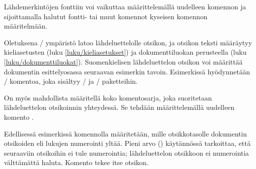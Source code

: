 \begin{koodilohkosis}
\setlength{\parindent}{1.1em} %
\setlength{\bibhang}{\parindent}
\setlength{\bibsep}{.5ex plus .1ex minus .1ex}
\end{koodilohkosis}

Lähdemerkintöjen fonttiin voi vaikuttaa määrittelemällä uudelleen
komennon  ja sijoittamalla halutut fontti- tai muut
komennot kyseisen komennon määritelmään.

\begin{koodilohkosis}
\renewcommand{\bibfont}{\sffamily\small}
\end{koodilohkosis}

Oletuksena \-/ ympäristö latoo
lähdeluettelolle otsikon, ja otsikon teksti määräytyy kieliasetusten
(luku \ref{luku/kieliasetukset}) ja dokumenttiluokan perusteella (luku
\ref{luku/dokumenttiluokat}). Suomenkielisen lähdeluettelon otsikon voi
määrittää dokumentin esittelyosassa seuraavan esimerkin tavoin.
Esimerkissä hyödynnetään \-/ komentoa, joka sisältyy
\-/{} ja \-/ paketteihin.

\begin{koodilohkosis}
\addto{\captionsfinnish}{%
  \renewcommand{\refname}{Lähteet} %
  \renewcommand{\bibname}{Lähteet} %
}
\end{koodilohkosis}

On myös mahdollista määritellä koko komentosarja, joka suoritetaan
lähdeluettelon otsikoinnin yhteydessä. Se tehdään määrittelemällä
uudelleen komento .

\begin{koodilohkosis}
\renewcommand{\bibsection}{%
  \setcounter{secnumdepth}{-1}
  \section{Lähteet}
}
\end{koodilohkosis}

Edellisessä esimerkissä komennolla  määritetään,
mille otsikkotasolle dokumentin otsikoiden eli lukujen numerointi yltää.
Pieni arvo \mbox{()} käytännössä tarkoittaa, että seuraaviin
otsikoihin ei tule numerointia; lähdeluettelon otsikkoon ei numerointia
välttämättä haluta. Komento  tekee itse otsikon.

